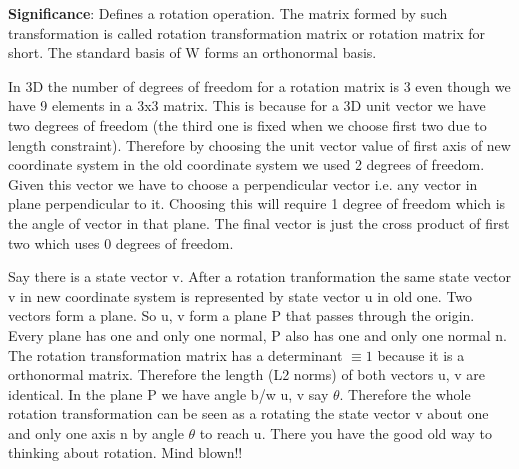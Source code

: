 \documentclass[../main.tex]{subfiles}
\begin{document}
{\color{magenta} \textbf{Significance}:
Defines a rotation operation.
The matrix formed by such transformation is called rotation transformation matrix or rotation matrix for short.
The standard basis of W forms an orthonormal basis.

In 3D the number of degrees of freedom for a rotation matrix is 3 even though we have 9 elements in a 3x3 matrix.
This is because for a 3D unit vector we have two degrees of freedom (the third one is fixed when we choose first two due to length constraint).
Therefore by choosing the unit vector value of first axis of new coordinate system in the old coordinate system we used 2 degrees of freedom.
Given this vector we have to choose a perpendicular vector i.e. any vector in plane perpendicular to it.
Choosing this will require 1 degree of freedom which is the angle of vector in that plane.
The final vector is just the cross product of first two which uses 0 degrees of freedom.

Say there is a state vector v.
After a rotation tranformation the same state vector v in new coordinate system is represented by state vector u in old one.
Two vectors form a plane.
So u, v form a plane P that passes through the origin.
Every plane has one and only one normal, P also has one and only one normal n.
The rotation transformation matrix has a determinant $\equiv 1$ because it is a orthonormal matrix.
Therefore the length (L2 norms) of both vectors u, v are identical.
In the plane P we have angle b/w u, v say $\theta$.
Therefore the whole rotation transformation can be seen as a rotating the state vector v about one and only one axis n by angle $\theta$ to reach u.
There you have the good old way to thinking about rotation. Mind blown!!

}
\end{document}
